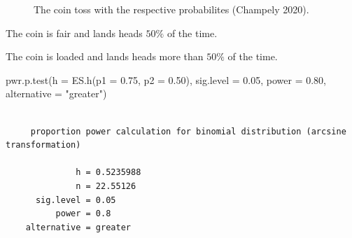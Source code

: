 \documentclass[
  a4paper,
]{scrbook}
\newenvironment{Shaded}{\begin{snugshade}}{\end{snugshade}}
\newcommand{\AttributeTok}[1]{\textcolor[rgb]{0.40,0.45,0.13}{#1}}
\newcommand{\FloatTok}[1]{\textcolor[rgb]{0.68,0.00,0.00}{#1}}
\newcommand{\FunctionTok}[1]{\textcolor[rgb]{0.28,0.35,0.67}{#1}}
\newcommand{\NormalTok}[1]{\textcolor[rgb]{0.00,0.23,0.31}{#1}}
\newcommand{\StringTok}[1]{\textcolor[rgb]{0.13,0.47,0.30}{#1}}
\providecommand{\tightlist}{%
  \setlength{\itemsep}{0pt}\setlength{\parskip}{0pt}}\usepackage{longtable,booktabs,array}
\let\olddescription\description
\let\endolddescription\enddescription
\renewenvironment{description}{
          \begin{spacing}{1.5}\olddescription
        }{
          \endolddescription\end{spacing}
        }
\begin{document}
\begin{figure}[H]


\caption{\label{fig-ct-prob}The coin toss with the respective
probabilites (Champely 2020).}

\end{figure}%

\begin{description}
\tightlist
\item[H0:]
The coin is fair and lands heads \(50\%\) of the time.
\item[Ha:]
The coin is loaded and lands heads more than \(50\%\) of the time.
\end{description}

\begin{Shaded}
\begin{Highlighting}[]
\FunctionTok{pwr.p.test}\NormalTok{(}\AttributeTok{h =} \FunctionTok{ES.h}\NormalTok{(}\AttributeTok{p1 =} \FloatTok{0.75}\NormalTok{, }\AttributeTok{p2 =} \FloatTok{0.50}\NormalTok{),}
           \AttributeTok{sig.level =} \FloatTok{0.05}\NormalTok{,}
           \AttributeTok{power =} \FloatTok{0.80}\NormalTok{,}
           \AttributeTok{alternative =} \StringTok{"greater"}\NormalTok{)}
\end{Highlighting}
\end{Shaded}

\begin{verbatim}

     proportion power calculation for binomial distribution (arcsine transformation) 

              h = 0.5235988
              n = 22.55126
      sig.level = 0.05
          power = 0.8
    alternative = greater
\end{verbatim}
\end{document}

